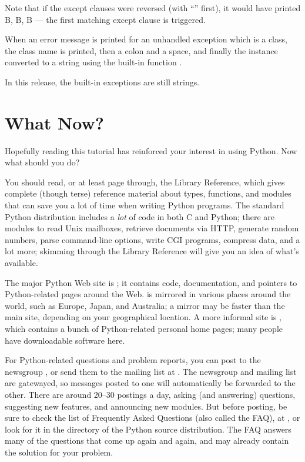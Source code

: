 Note that if the except clauses were reversed (with ``''
first), it would have printed B, B, B --- the first matching except
clause is triggered.

When an error message is printed for an unhandled exception which is a
class, the class name is printed, then a colon and a space, and
finally the instance converted to a string using the built-in function
.

In this release, the built-in exceptions are still strings.

\chapter{What Now?}

Hopefully reading this tutorial has reinforced your interest in using
Python.  Now what should you do?

You should read, or at least page through, the Library Reference,
which gives complete (though terse) reference material about types,
functions, and modules that can save you a lot of time when writing
Python programs.  The standard Python distribution includes a
\emph{lot} of code in both C and Python; there are modules to read
Unix mailboxes, retrieve documents via HTTP, generate random numbers,
parse command-line options, write CGI programs, compress data, and a
lot more; skimming through the Library Reference will give you an idea
of what's available.

The major Python Web site is ; it contains
code, documentation, and pointers to Python-related pages around the
Web.   is mirrored in various places around the
world, such as Europe, Japan, and Australia; a mirror may be faster
than the main site, depending on your geographical location.  A more
informal site is , which contains a
bunch of Python-related personal home pages; many people have
downloadable software here.

For Python-related questions and problem reports, you can post to the
newsgroup , or send them to the mailing list at
.  The newsgroup and mailing list are
gatewayed, so messages posted to one will automatically be forwarded
to the other.  There are around 20--30 postings a day, asking (and
answering) questions, suggesting new features, and announcing new
modules.  But before posting, be sure to check the list of Frequently
Asked Questions (also called the FAQ), at
, or look for it in the
 directory of the Python source distribution.  The FAQ
answers many of the questions that come up again and again, and may
already contain the solution for your problem.

